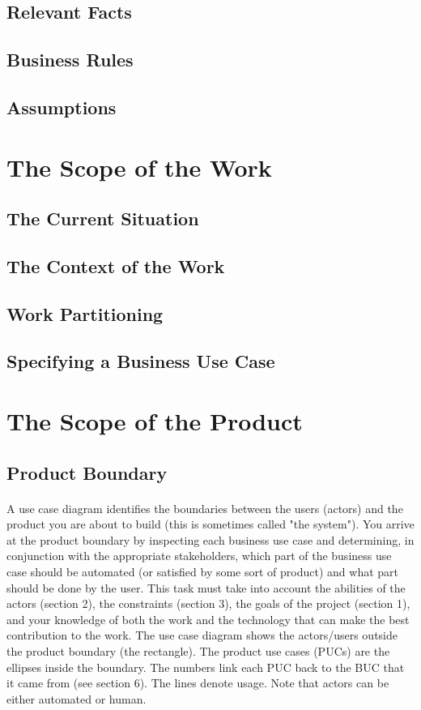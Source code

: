 \documentclass[12pt,a4paper]{article}
\begin{document}
\subsection{Relevant Facts}
\subsection{Business Rules}
\subsection{Assumptions}
\pagebreak
\section{The Scope of the Work}
\subsection{The Current Situation}
\subsection{The Context of the Work}
\subsection{Work Partitioning}
\subsection{Specifying a Business Use Case}
\pagebreak
\section{The Scope of the Product}
\subsection{Product Boundary}
\paragraph{}
A use case diagram identifies the boundaries between the users (actors) and the product you are about to build (this is sometimes called "the system"). You arrive at the product boundary by inspecting each business use case and determining, in conjunction with the appropriate stakeholders, which part of the business use case should be automated (or satisfied by some sort of product) and what part should be done by the user. This task must take into account the abilities of the actors (section 2), the constraints (section 3), the goals of the project (section 1), and your knowledge of both the work and the technology that can make the best contribution to the work.
The use case diagram shows the actors/users outside the product boundary (the rectangle). The product use cases (PUCs) are the ellipses inside the boundary. The numbers link each PUC back to the BUC that it came from (see section 6). The lines denote usage. Note that actors can be either automated or human.
\end{document}
